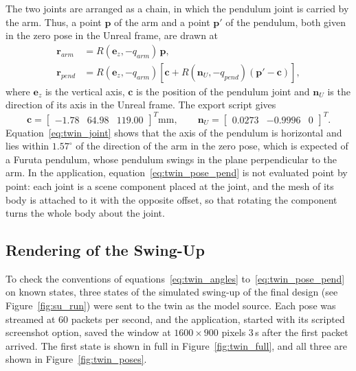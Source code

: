 \documentclass[a4paper,11pt]{article}
\begin{document}
The two joints are arranged as a chain, in which the pendulum joint is carried by the arm. Thus, a point $\mathbf{p}$ of the arm and a point $\mathbf{p}'$ of the pendulum, both given in the zero pose in the Unreal frame, are drawn at
\begin{align}
  \mathbf{r}_{arm} &= R(\mathbf{e}_z, -q_{arm})\, \mathbf{p}, \label{eq:twin_pose_arm}\\
  \mathbf{r}_{pend} &= R(\mathbf{e}_z, -q_{arm}) \left[\mathbf{c} + R(\mathbf{n}_U, -q_{pend}) \left(\mathbf{p}' - \mathbf{c}\right)\right], \label{eq:twin_pose_pend}
\end{align}
where $\mathbf{e}_z$ is the vertical axis, $\mathbf{c}$ is the position of the pendulum joint and $\mathbf{n}_U$ is the direction of its axis in the Unreal frame. The export script gives
\begin{equation}
  \mathbf{c} = \begin{bmatrix} -1.78 & 64.98 & 119.00 \end{bmatrix}^T \mathrm{mm}, \qquad
  \mathbf{n}_U = \begin{bmatrix} 0.0273 & -0.9996 & 0 \end{bmatrix}^T .
  \label{eq:twin_joint}
\end{equation}
Equation~\ref{eq:twin_joint} shows that the axis of the pendulum is horizontal and lies within $1.57^\circ$ of the direction of the arm in the zero pose, which is expected of a Furuta pendulum, whose pendulum swings in the plane perpendicular to the arm. In the application, equation~\ref{eq:twin_pose_pend} is not evaluated point by point: each joint is a scene component placed at the joint, and the mesh of its body is attached to it with the opposite offset, so that rotating the component turns the whole body about the joint.

\subsection{Rendering of the Swing-Up}
\label{sec:twin_results}
To check the conventions of equations~\ref{eq:twin_angles} to~\ref{eq:twin_pose_pend} on known states, three states of the simulated swing-up of the final design (see Figure~\ref{fig:su_run}) were sent to the twin as the model source. Each pose was streamed at 60 packets per second, and the application, started with its scripted screenshot option, saved the window at $1600 \times 900$ pixels 3\,s after the first packet arrived. The first state is shown in full in Figure~\ref{fig:twin_full}, and all three are shown in Figure~\ref{fig:twin_poses}.
\end{document}
